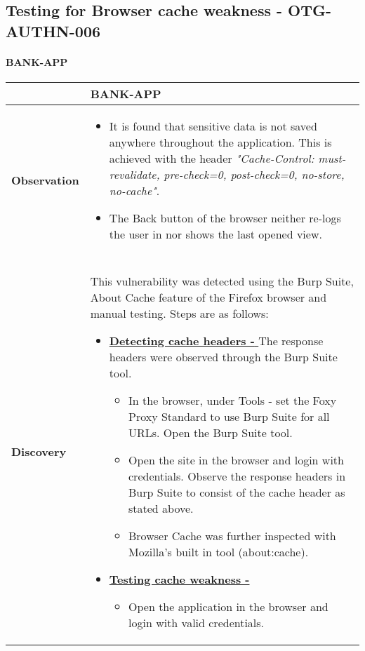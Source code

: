 \subsection{Testing for Browser cache weakness - OTG-AUTHN-006}

\paragraph{BANK-APP} \mbox{}
\begin{longtable*}{p{.20\textwidth} | p{.80\textwidth}}
    \hline
    & \textbf{BANK-APP} \\
    \hline
    \textbf{Observation} &
     \begin{itemize}
     \item It is found that sensitive data is not saved anywhere throughout the application. This is achieved with the header
          \textit{"Cache-Control: must-revalidate, pre-check=0, post-check=0, no-store, no-cache"}.
     
     \item The Back button of the browser neither re-logs the user in nor shows the last opened view.
     \end{itemize}
    \\\\
    \textbf{Discovery} &
      This vulnerability was detected using the Burp Suite, About Cache feature of the Firefox browser and manual testing. Steps are as follows:
      \begin{itemize}
	      \item \underline{\textbf{Detecting cache headers - }} The response headers were observed through the Burp Suite tool.
	      
	      \begin{itemize}
		      \item In the browser, under Tools - set the Foxy Proxy Standard to use Burp Suite for all URLs. Open the Burp Suite tool.		      
		      \item  Open the site in the browser and login with credentials. Observe the response headers in Burp Suite to consist of the cache header as stated above.
		      \item  Browser Cache was further inspected with Mozilla's built in tool (about:cache).
	      \end{itemize}
	   \item \underline{\textbf{Testing cache weakness -}}
	   	\begin{itemize}
		   	\item Open the application in the browser and login with valid credentials.
		   	

\end{itemize}
\end{itemize}
\end{longtable*}
